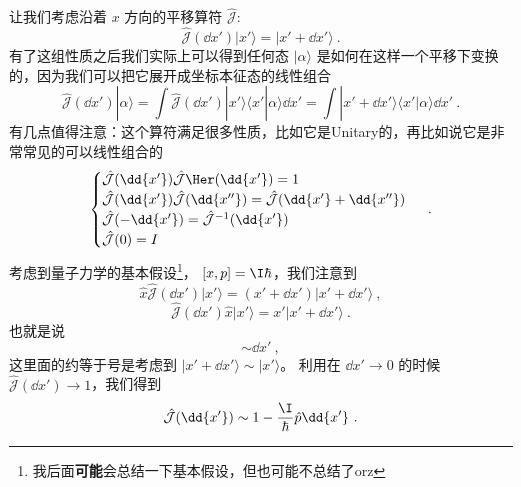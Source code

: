 让我们考虑沿着 $x$ 方向的平移算符 $\hat{\mathcal J}$: 
\begin{equation}
\hat{\mathcal{J}}(\dd{x'})|x'\rangle = |x'+\dd{x'}\rangle~.
\end{equation}
有了这组性质之后我们实际上可以得到任何态 $|\alpha\rangle$ 是如何在这样一个平移下变换的，因为我们可以把它展开成坐标本征态的线性组合
\begin{equation}
\hat{\mathcal{J}}(\dd{x'})|\alpha\rangle = \int\hat{\mathcal{J}}(\dd{x'})|x'\rangle\langle x'|\alpha\rangle \dd{x'} = \int|x'+\dd{x'}\rangle\langle x'|\alpha\rangle \dd{x'}~.
\end{equation}
有几点值得注意：这个算符满足很多性质，比如它是Unitary的，再比如说它是非常常见的可以线性组合的
\begin{equation}
\begin{cases}
\hat{\mathcal{J}}(\dd{x'})\hat{\mathcal{J}}\Her (\dd{x'}) = 1\\
\hat{\mathcal{J}}(\dd{x'})\hat{\mathcal{J}}(\dd{x''}) = \hat{\mathcal{J}}(\dd{x'} + \dd{x''})\\
\hat{\mathcal{J}}(-\dd{x'}) = \hat{\mathcal{J}}^{-1}(\dd{x'})\\
\hat{\mathcal{J}}(0) = I
\end{cases}~.
\end{equation}
考虑到量子力学的基本假设\footnote{我后面\textbf{可能}会总结一下基本假设，但也可能不总结了orz}， $[x,p] = \I\hbar$，我们注意到
\begin{equation}
\hat{x}\hat{\mathcal{J}}(\dd{x'})|x'\rangle = (x'+\dd{x'})|x'+\dd{x'}\rangle~,
\end{equation}
\begin{equation}
\hat{\mathcal{J}}(\dd{x'})\hat{x}|x'\rangle = x'|x'+\dd{x'}\rangle~.
\end{equation}
也就是说
\begin{equation}
[\hat{x},\hat{\mathcal{J}}(\dd{x'})] \sim \dd{x'}~,
\end{equation}
这里面的约等于号是考虑到 $|x'+\dd{x'}\rangle \sim |x'\rangle$。 利用在 $\dd{x'}\rightarrow0$ 的时候 $\hat{\mathcal{J}}(\dd{x'})\rightarrow1$，我们得到
\begin{equation}
\hat{\mathcal{J}}(\dd{x'}) \sim 1-\frac{\I}{\hbar}\hat{p}\dd{x'}~.
\end{equation}

